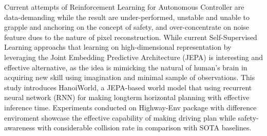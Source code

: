 Current attempts of Reinforcement Learning for Autonomous Controller are data-demanding while the result are under-performed, unstable and unable to grapple and anchoring on the concept of safety, and over-concentrate on noise feature dues to the nature of pixel reconstruction. While current Self-Supervised Learning approachs that learning on high-dimensional representation by leveraging the Joint Embedding Predictive Architecture (JEPA) is interesting and effective alternative, as the idea is mimicking the natural of human's brain in acquiring new skill using imagination and minimal sample of observations. This study introduces HanoiWorld, a JEPA-based world model that using recurrent neural network (RNN) for making longterm horizontal planning with effective inference time. Experiments conducted on Highway-Env package with difference enviroment showcase the effective capability of making driving plan while safety-awareness with considerable collision rate in comparison with SOTA baselines.